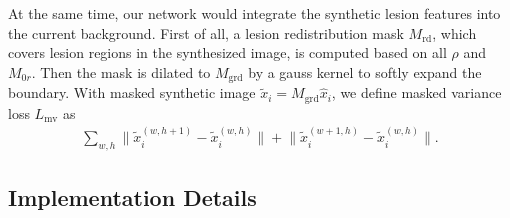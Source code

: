 \documentclass[letterpaper]{article} %
\begin{document}
	At the same time, our network would integrate the synthetic lesion features into the current background. First of all, a lesion redistribution mask $ M_\mathrm{rd} $, which covers lesion regions in the synthesized image, is computed based on all $ \rho $ and $ M_{0r} $. Then the mask is dilated to $ M_\mathrm{grd} $ by a gauss kernel to softly expand the boundary. With masked synthetic image $ \tilde{x}_i = M_\mathrm{grd} \hat{x}_i $, we define masked variance loss $L_\mathrm{mv}$ as
	\begin{align}
	\label{align_mtv_loss} \textstyle
	\sum_{w,h}{\lVert \tilde{x}_i^{(w,h+1)} - \tilde{x}_i^{(w,h)} \lVert}
	+ {\lVert \tilde{x}_i^{(w+1,h)} - \tilde{x}_i^{(w,h)} \lVert}.
	\end{align}
	
	
	
	
	
	
	
	\subsection{Implementation Details}
	
	
	
\end{document}
